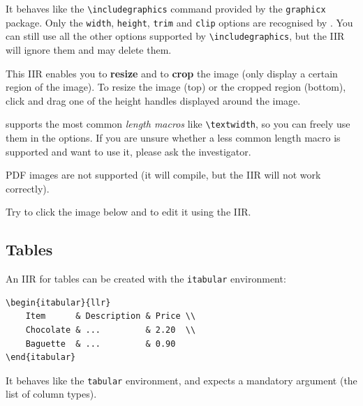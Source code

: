 \documentclass[11pt, a4paper]{article}
\begin{document}
It behaves like the \verb|\includegraphics| command provided by the \texttt{graphicx} package.
Only the \texttt{width}, \texttt{height}, \texttt{trim} and \texttt{clip} options are recognised by \iLaTeX{}.
You can still use all the other options supported by \verb|\includegraphics|, but the IIR will ignore them and may delete them.

This IIR enables you to \textbf{resize} and to \textbf{crop} the image (\ie only display a certain region of the image). To resize the image (top) or the cropped region (bottom), click and drag one of the height handles displayed around the image.

\begin{info}
    \iLaTeX{} supports the most common \emph{length macros} like \verb|\textwidth|, so you can freely use them in the options.
    If you are unsure whether a less common length macro is supported and want to use it, please ask the investigator.
\end{info}

\begin{warning}
    PDF images are not supported (it will compile, but the IIR will not work correctly).
\end{warning}

\begin{example}
    Try to click the image below and to edit it using the IIR.
    
    \centering
\end{example}




\newpage
\subsection{Tables}

An IIR for tables can be created with the \texttt{itabular} environment:

\begin{lstlisting}[style=custom-latex]
\begin{itabular}{llr}
    Item      & Description & Price \\
    Chocolate & ...         & 2.20  \\
    Baguette  & ...         & 0.90
\end{itabular}
\end{lstlisting}

It behaves like the \texttt{tabular} environment, and expects a mandatory argument (the list of column types).
\end{document}
